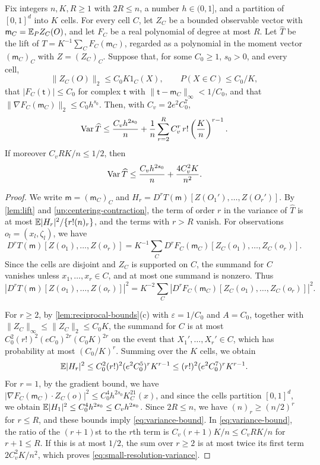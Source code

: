 \begin{lemma}\label{lem:variance}
Fix integers $n,K,R\ge1$ with $2R\le n$, a number $h\in(0,1]$, and a
partition of $[0,1]^d$ into $K$ cells. For every cell $C$, let $Z_C$ be a
bounded observable vector with $\mathsf m_C=\mathbb E_PZ_C(O)$, and let $F_C$ be
a real polynomial of degree at most $R$. Let $\widehat T$ be the lift of
$T=K^{-1}\sum_CF_C(\mathsf m_C)$, regarded as a polynomial in the moment
vector $(\mathsf m_C)_C$ with $Z=(Z_C)_C$. Suppose that, for some
$C_0\ge1$, $s_0>0$, and every cell,
\[
 \|Z_C(O)\|_2\le C_0K1_C(X),\qquad P(X\in C)\le C_0/K,
\]
that $|F_C(\mathsf t)|\le C_0$ for complex $\mathsf t$ with
$\|\mathsf t-\mathsf m_C\|_\infty<1/C_0$, and that
$\|\nabla F_C(\mathsf m_C)\|_2\le C_0h^{s_0}$. Then, with
$C_v=2e^2C_0^7$,
\begin{equation}\label{eq:variance-bound}
 \operatorname{Var}\widehat T\le\frac{C_vh^{2s_0}}n
   +\frac1n\sum_{r=2}^RC_v^r\,r!\left(\frac Kn\right)^{r-1}.
\end{equation}
If moreover $C_vRK/n\le1/2$, then
\begin{equation}\label{eq:small-resolution-variance}
 \operatorname{Var}\widehat T\le\frac{C_vh^{2s_0}}n+\frac{4C_v^2K}{n^2}.
\end{equation}
\end{lemma}
\begin{proof}
We write $\mathsf m=(\mathsf m_C)_C$ and
$H_r=D^rT(\mathsf m)[Z(O_1'),\ldots,Z(O_r')]$. By \cref{lem:lift} and
\eqref{up:centering-contraction}, the term of order $r$ in the variance
of $\widehat T$ is at most $\mathbb E|H_r|^2/\{r!(n)_r\}$, and the terms with
$r>R$ vanish. For observations $o_l=(x_l,\zeta_l)$, we have
\[
 D^rT(\mathsf m)[Z(o_1),\ldots,Z(o_r)]
 =K^{-1}\sum_CD^rF_C(\mathsf m_C)[Z_C(o_1),\ldots,Z_C(o_r)].
\]
Since the cells are disjoint and $Z_C$ is supported on $C$, the summand
for $C$ vanishes unless $x_1,\ldots,x_r\in C$, and at most one summand
is nonzero. Thus
\[
 |D^rT(\mathsf m)[Z(o_1),\ldots,Z(o_r)]|^2
 =K^{-2}\sum_C|D^rF_C(\mathsf m_C)[Z_C(o_1),\ldots,Z_C(o_r)]|^2.
\]

For $r\ge2$, by \cref{lem:reciprocal-bounds}(c) with
$\varepsilon=1/C_0$ and $A=C_0$, together with
$\|Z_C\|_\infty\le\|Z_C\|_2\le C_0K$, the summand for $C$ is at most
$C_0^2(r!)^2(eC_0)^{2r}(C_0K)^{2r}$ on the event that
$X_1',\ldots,X_r'\in C$, which has probability at most $(C_0/K)^r$. Summing
over the $K$ cells, we obtain
\[
 \mathbb E|H_r|^2
 \le C_0^2(r!)^2(e^2C_0^5)^rK^{r-1}
 \le(r!)^2(e^2C_0^7)^rK^{r-1}.
\]
For $r=1$, by the gradient bound, we have
$|\nabla F_C(\mathsf m_C)\cdot Z_C(o)|^2\le C_0^4h^{2s_0}K^21_C(x)$, and
since the cells partition $[0,1]^d$, we obtain
$\mathbb E|H_1|^2\le C_0^4h^{2s_0}\le C_vh^{2s_0}$. Since $2R\le n$, we have
$(n)_r\ge(n/2)^r$ for $r\le R$, and these bounds imply
\eqref{eq:variance-bound}. In \eqref{eq:variance-bound}, the ratio of the
$(r+1)$st to the $r$th term is $C_v(r+1)K/n\le C_vRK/n$ for $r+1\le R$. If
this is at most $1/2$, the sum over $r\ge2$ is at most twice its first
term $2C_v^2K/n^2$, which proves \eqref{eq:small-resolution-variance}.
\end{proof}

